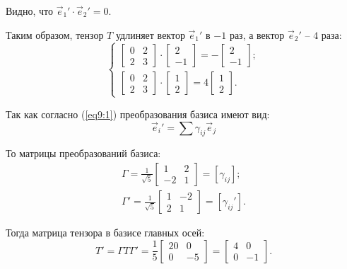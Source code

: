 \begin{solution}
	Видно, что \( \vec{e}_1{'} \cdot \vec{e}_2{'} = 0 \).
	
	Таким образом, тензор \( T \) удлиняет вектор \( \vec{e}_1{'} \) в \( -1 \) раз, а вектор \( \vec{e}_2{'} \) -- \( 4 \) раза:
	\[ \left\{ \begin{array}{l} \begin{bmatrix}
		0 & 2 \\
		2 & 3
	\end{bmatrix} \cdot \begin{bmatrix}
		2 \\ -1
	\end{bmatrix} = -\begin{bmatrix}
		2 \\ -1
	\end{bmatrix}; \\[0.2cm]
	\begin{bmatrix}
		0 & 2 \\
		2 & 3
	\end{bmatrix} \cdot \begin{bmatrix}
		1 \\ 2
	\end{bmatrix} = 4\begin{bmatrix}
		1 \\ 2
	\end{bmatrix}. \end{array} \right. \]
	\end{solution}
	
	\begin{remark}
	Так как согласно (\ref{eq9:1}) преобразования базиса имеют вид:
	\[ \vec{e}_i{'} = \sum \gamma_{ij}\vec{e}_j \]
	
	То матрицы преобразований базиса:
	\[ \begin{array}{l} 
	\Gamma = \frac{1}{\sqrt{5}} \begin{bmatrix}
		1 & 2 \\
		-2 & 1
	\end{bmatrix}	= [\gamma_{ij}]; \\[0.2cm]
	\Gamma{'} = \frac{1}{\sqrt{5}} \begin{bmatrix}
		1 & -2 \\
		2 & 1
	\end{bmatrix} = [\gamma_{ij}{'}]. \end{array} \]
	
	Тогда матрица тензора в базисе главных осей:
	\[ T{'} = \Gamma T \Gamma{'} = \frac{1}{5} \begin{bmatrix}
		20 & 0 \\
		0 & -5
	\end{bmatrix} = \begin{bmatrix}
		4 & 0 \\
		0 & -1
	\end{bmatrix}. \]
	\end{remark}
	
